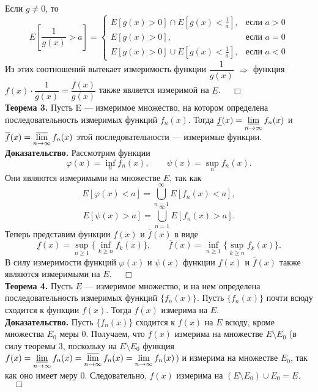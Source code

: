 \documentclass[12pt,a4paper, titlepage]{article}
\begin{document}
Если $g \neq 0$, то
$$
E[\frac 1 {g(x)} > a]=\begin{cases}
E[g(x) > 0] \cap E[g(x)< \frac 1 a], &\text{если $a > 0$}\\
E[g(x) > 0], &\text{если $a = 0$}\\
E[g(x) > 0] \cup E[g(x) < \frac 1 a], &\text{если $a < 0$}
\end{cases}
$$
Из этих соотношений вытекает измеримость функции $\dfrac{1}{g(x)}$ $\Rightarrow$ функция $f(x) \cdot \dfrac{1}{g(x)} = \dfrac{f(x)}{g(x)}$ также является измеримой на $E$. $\quad \Box$\\

\textbf{Теорема 3.} Пусть E --- измеримое множество, на котором определена последовательность измеримых функций ${f_n(x)}$.
Тогда $\underline{f}(x) = \varliminf\limits_{n \to \infty} f_n(x)$ и $\overline{f}(x) = \varlimsup\limits_{n \to \infty} f_n(x)$ этой последовательности --- измеримые функции.\\
\textbf{Доказательство.} Рассмотрим функции
$$
\varphi(x) = \inf_n f_n(x), \qquad \psi(x) = \sup_n f_n(x).
$$
Они являются измеримыми на множестве $E$, так как
$$
E[\varphi(x) < a] = \bigcup_{n=1}^\infty E[f_n(x) < a],
$$
$$
E[\psi(x) > a] = \bigcup_{n=1}^\infty E[f_n(x) > a].
$$
Теперь представим функции $\underline{f}(x)$ и $\overline{f}(x)$ в виде
$$
\underline{f}(x) = \sup_{n \geqslant 1} \lbrace \inf_{k \geqslant n} f_k(x) \rbrace, \qquad
\overline{f}(x) = \inf_{n \geqslant 1} \lbrace \sup_{k \geqslant n} f_k(x) \rbrace.
$$
В силу измеримости функций $\varphi(x)$ и $\psi(x)$ функции $\underline{f}(x)$ и $\overline{f}(x)$ также являются измеримыми на $E$. $\quad \Box$\\

\textbf{Теорема 4.} Пусть $E$ --- измеримое множество, и на нем определена последовательность измеримых функций $\lbrace f_n(x) \rbrace$. Пусть $\lbrace f_n(x) \rbrace$ почти всюду сходится к функции $f(x)$. Тогда $f(x)$ измерима на $E$.\\
\textbf{Доказательство.}
Пусть $\lbrace f_n(x) \rbrace$ сходится к $f(x)$ на $E$ всюду, кроме множества $E_0$ меры 0. Получаем, что $f(x)$ измерима на множестве $E \setminus E_0$ (в силу теоремы 3, поскольку на $E \setminus E_0$ функция $f(x) = \varliminf\limits_{n \to \infty} f_n(x) = \varlimsup\limits_{n \to \infty} f_n(x) = \lim\limits_{n \to \infty} f_n(x)$) и измерима на множестве $E_0$, так как оно имеет меру 0. Следовательно, $f(x)$ измерима на $(E \setminus E_0) \cup E_0 = E$. $\quad \Box$\\
\end{document}
